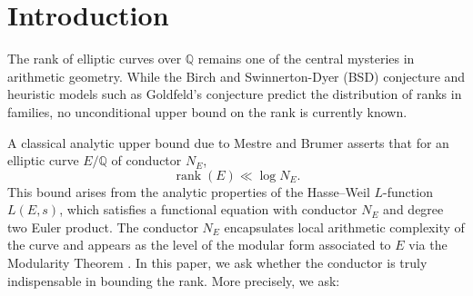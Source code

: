 \documentclass[a4paper,11pt]{article}
\theoremstyle{thmstyleone}%
\theoremstyle{thmstyletwo}%
\theoremstyle{thmstylethree}%
\begin{document}
	
	
	






	


	\section{Introduction}
	
	The rank of elliptic curves over \( \mathbb{Q} \) remains one of the central mysteries in arithmetic geometry. While the Birch and Swinnerton-Dyer (BSD) conjecture \cite{coates1977conjecture} and heuristic models such as Goldfeld's conjecture \cite{goldfeld2006conjectures} predict the distribution of ranks in families, no unconditional upper bound on the rank is currently known. 
	
	A classical analytic upper bound due to Mestre and Brumer \cite{mestre1986formules, brumer1977rank} asserts that for an elliptic curve \( E/\mathbb{Q} \) of conductor \( N_E \),
	\[
	\operatorname{rank}(E) \ll \log N_E.
	\]
	This bound arises from the analytic properties of the Hasse–Weil \( L \)-function \( L(E, s) \), which satisfies a functional equation with conductor \( N_E \) and degree two Euler product. The conductor \( N_E \) encapsulates local arithmetic complexity of the curve and appears as the level of the modular form associated to \( E \) via the Modularity Theorem 
	\cite{breuil2001modularity}.
	In this paper, we ask whether the conductor is truly indispensable in bounding the rank. More precisely, we ask:
	
\end{document}
